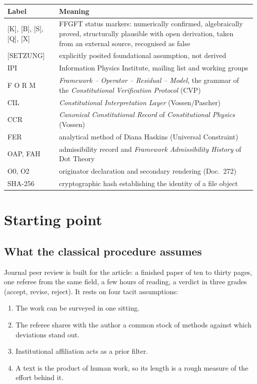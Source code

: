 \medskip
\begin{tabular}{@{}lp{11cm}@{}}
\toprule
\textbf{Label} & \textbf{Meaning} \\
\midrule
{[K]}, {[B]}, {[S]}, {[Q]}, {[X]} & FFGFT status markers: numerically confirmed, algebraically proved,
  structurally plausible with open derivation, taken from an external source, recognised as false \\
{[SETZUNG]} & explicitly posited foundational assumption, not derived \\
IPI & Information Physics Institute, mailing list and working groups \\
F O R M & \emph{Framework -- Operator -- Residual -- Model}, the grammar of the
  \emph{Constitutional Verification Protocol} (CVP) \\
CIL & \emph{Constitutional Interpretation Layer} (Vossen/Pascher) \\
CCR & \emph{Canonical Constitutional Record} of \emph{Constitutional Physics} (Vossen) \\
FER & analytical method of Diana Haskins (Universal Constraint) \\
OAP, FAH & admissibility record and \emph{Framework Admissibility History} of Dot Theory \\
O0, O2 & originator declaration and secondary rendering (Doc.~272) \\
SHA-256 & cryptographic hash establishing the identity of a file object \\
\bottomrule
\end{tabular}

\section{Starting point}

\subsection{What the classical procedure assumes}

Journal peer review is built for the article: a finished paper of ten to thirty pages,
one referee from the same field, a few hours of reading, a verdict in three grades
(accept, revise, reject). It rests on four tacit assumptions:
\begin{enumerate}
\item The work can be surveyed in one sitting.
\item The referee shares with the author a common stock of methods against which
  deviations stand out.
\item Institutional affiliation acts as a prior filter.
\item A text is the product of human work, so its length is a rough measure of the effort
  behind it.
\end{enumerate}

